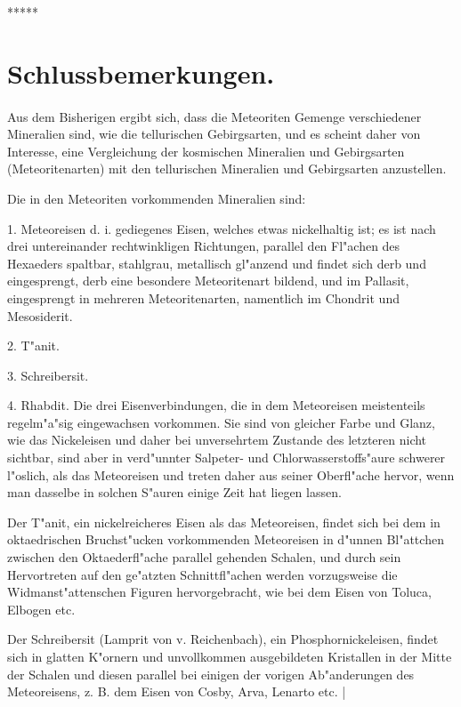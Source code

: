 \documentclass[a4paper, 11pt, oneside, german]{article}
\begin{document}
\centerline{*\hspace{15mm}*\hspace{15mm}*\hspace{15mm}*\hspace{15mm}*}
\clearpage
\section{Schlussbemerkungen.}
\paragraph{}
Aus dem Bisherigen ergibt sich, dass die Meteoriten Gemenge verschiedener Mineralien sind, wie die tellurischen Gebirgsarten, und es scheint daher von Interesse, eine Vergleichung der kosmischen Mineralien und Gebirgsarten (Meteoritenarten) mit den tellurischen Mineralien und Gebirgsarten anzustellen.

Die in den Meteoriten vorkommenden Mineralien sind:

1. Meteoreisen d. i. gediegenes Eisen, welches etwas nickelhaltig ist; es ist nach drei untereinander rechtwinkligen Richtungen, parallel den Fl"achen des Hexaeders spaltbar, stahlgrau, metallisch gl"anzend und findet sich derb und eingesprengt, derb eine besondere Meteoritenart bildend, und im Pallasit, eingesprengt in mehreren Meteoritenarten, namentlich im Chondrit und Mesosiderit.

2. T"anit.

3. Schreibersit.

4. Rhabdit. Die drei Eisenverbindungen, die in dem Meteoreisen meistenteils regelm"a"sig eingewachsen vorkommen. Sie sind von gleicher Farbe und Glanz, wie das Nickeleisen und daher bei unversehrtem Zustande des letzteren nicht sichtbar, sind aber in verd"unnter Salpeter- und Chlorwasserstoffs"aure schwerer l"oslich, als das Meteoreisen und treten daher aus seiner Oberfl"ache hervor, wenn man dasselbe in solchen S"auren einige Zeit hat liegen lassen.

Der T"anit, ein nickelreicheres Eisen als das Meteoreisen, findet sich bei dem in oktaedrischen Bruchst"ucken vorkommenden Meteoreisen in d"unnen Bl"attchen zwischen den Oktaederfl"ache parallel gehenden Schalen, und durch sein Hervortreten auf den ge"atzten Schnittfl"achen werden vorzugsweise die Widmanst"attenschen Figuren hervorgebracht, wie bei dem Eisen von Toluca, Elbogen etc.

Der Schreibersit (Lamprit von v. Reichenbach), ein Phosphornickeleisen, findet sich in glatten K"ornern und unvollkommen ausgebildeten Kristallen in der Mitte der Schalen und diesen parallel bei einigen der vorigen Ab"anderungen des Meteoreisens, z. B. dem Eisen von Cosby, Arva, Lenarto etc. |
\end{document}
